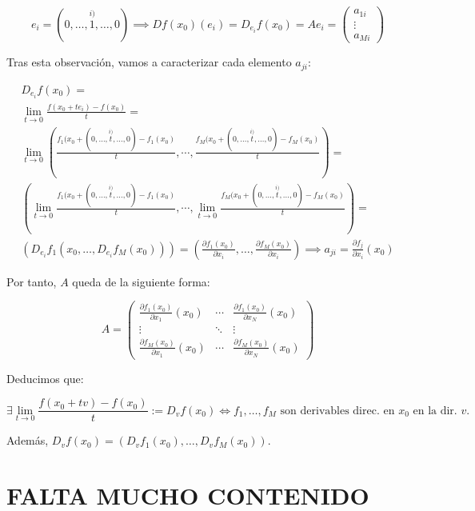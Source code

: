 	\[
		e_i = (0, \dots, \stackrel{i)}{1}, \dots, 0) \implies Df(x_0)(e_i) = D_{e_i}f(x_0) = Ae_i = \begin{pmatrix}
	a_{1i}\\ \vdots\\ a_{Mi}
\end{pmatrix}
	\]

Tras esta observación, vamos a caracterizar cada elemento $a_{ji}$:

\begin{align*}
	D_{e_i}f(x_0) = \\\lim_{t\to 0} \frac{f(x_0+te_i)-f(x_0)}{t} = \\\lim_{t\to 0} \left(\frac{f_1(x_0+(0,\dots,\stackrel{i)}{t},\dots,0)-f_1(x_0)}{t},\right.\left.\cdots, \frac{f_M(x_0+(0,\dots,\stackrel{i)}{t},\dots,0)-f_M(x_0)}{t}\right)=\\
	 \left(\lim_{t\to 0} \frac{f_1(x_0+(0,\dots,\stackrel{i)}{t},\dots,0)-f_1(x_0)}{t}, \cdots, \lim_{t\to 0} \frac{f_M(x_0+(0,\dots,\stackrel{i)}{t},\dots,0)-f_M(x_0)}{t}\right) =\\
	 \left(D_{e_i}f_1(x_0, \dots, D_{e_i}f_M(x_0))\right) = \left(\frac{\partial f_1(x_0)}{\partial x_i}, \dots, \frac{\partial f_M(x_0)}{\partial x_i}\right) \implies a_{ji} = \frac{\partial f_j}{\partial x_i} (x_0)
\end{align*}

Por tanto, $A$ queda de la siguiente forma:

\[
	A = \begin{pmatrix}
	\frac{\partial f_1(x_0)}{\partial x_1} (x_0) & \cdots & \frac{\partial f_1(x_0)}{\partial x_N} (x_0)\\
	\vdots & \ddots & \vdots\\
	\frac{\partial f_M(x_0)}{\partial x_1} (x_0) & \cdots & \frac{\partial f_M(x_0)}{\partial x_N} (x_0)
\end{pmatrix}
\]

Deducimos que:

\[
	\exists \lim_{t\to 0} \frac{f(x_0+tv) - f(x_0)}{t} := D_vf(x_0) \iff f_1, \dots, f_M \text{ son derivables direc. en $x_0$ en la dir. $v$.}
\]

Además, $D_vf(x_0) = (D_vf_1(x_0), \dots, D_vf_M(x_0))$.







\section{FALTA MUCHO CONTENIDO}

